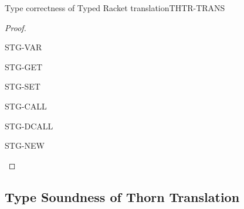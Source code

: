 \documentclass[acmlarge, anonymous, authordraft]{acmart}
\begin{document}
\begin{lemma}{Type correctness of Typed Racket translation}{THTR-TRANS}
  \begin{conds}
    \cond{$\TR\K = \Kp$}
    \cond{$\TR\Env = \Envp$}
  \end{conds}

  \then\axiom{$\EnvType\Envp\cdot\Kp{\TRG{\e}\Env}{\t}$}

  \begin{proof} \indmsg{\EnvTypeW\Env\K\e\t}

    \begin{case}{STG-VAR}    
    \end{case}

    \begin{case}{STG-GET}
    \end{case}

    \begin{case}{STG-SET}
    \end{case}

    \begin{case}{STG-CALL}
    \end{case}

    \begin{case}{STG-DCALL}
    \end{case}

    \begin{case}{STG-NEW}
    \end{case}
  \end{proof}
\end{lemma}
\subsection{Type Soundness of Thorn Translation}
\end{document}
